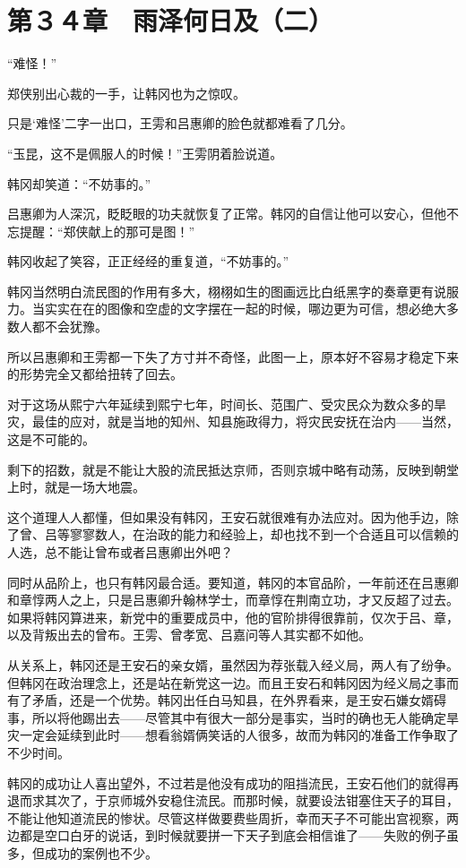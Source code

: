 \section{第３４章　雨泽何日及（二）}

“难怪！”

郑侠别出心裁的一手，让韩冈也为之惊叹。

只是‘难怪’二字一出口，王雱和吕惠卿的脸色就都难看了几分。

“玉昆，这不是佩服人的时候！”王雱阴着脸说道。

韩冈却笑道：“不妨事的。”

吕惠卿为人深沉，眨眨眼的功夫就恢复了正常。韩冈的自信让他可以安心，但他不忘提醒：“郑侠献上的那可是图！”

韩冈收起了笑容，正正经经的重复道，“不妨事的。”

韩冈当然明白流民图的作用有多大，栩栩如生的图画远比白纸黑字的奏章更有说服力。当实实在在的图像和空虚的文字摆在一起的时候，哪边更为可信，想必绝大多数人都不会犹豫。

所以吕惠卿和王雱都一下失了方寸并不奇怪，此图一上，原本好不容易才稳定下来的形势完全又都给扭转了回去。

对于这场从熙宁六年延续到熙宁七年，时间长、范围广、受灾民众为数众多的旱灾，最佳的应对，就是当地的知州、知县施政得力，将灾民安抚在治内——当然，这是不可能的。

剩下的招数，就是不能让大股的流民抵达京师，否则京城中略有动荡，反映到朝堂上时，就是一场大地震。

这个道理人人都懂，但如果没有韩冈，王安石就很难有办法应对。因为他手边，除了曾、吕等寥寥数人，在治政的能力和经验上，却也找不到一个合适且可以信赖的人选，总不能让曾布或者吕惠卿出外吧？

同时从品阶上，也只有韩冈最合适。要知道，韩冈的本官品阶，一年前还在吕惠卿和章惇两人之上，只是吕惠卿升翰林学士，而章惇在荆南立功，才又反超了过去。如果将韩冈算进来，新党中的重要成员中，他的官阶排得很靠前，仅次于吕、章，以及背叛出去的曾布。王雱、曾孝宽、吕嘉问等人其实都不如他。

从关系上，韩冈还是王安石的亲女婿，虽然因为荐张载入经义局，两人有了纷争。但韩冈在政治理念上，还是站在新党这一边。而且王安石和韩冈因为经义局之事而有了矛盾，还是一个优势。韩冈出任白马知县，在外界看来，是王安石嫌女婿碍事，所以将他踢出去——尽管其中有很大一部分是事实，当时的确也无人能确定旱灾一定会延续到此时——想看翁婿俩笑话的人很多，故而为韩冈的准备工作争取了不少时间。

韩冈的成功让人喜出望外，不过若是他没有成功的阻挡流民，王安石他们的就得再退而求其次了，于京师城外安稳住流民。而那时候，就要设法钳塞住天子的耳目，不能让他知道流民的惨状。尽管这样做要费些周折，幸而天子不可能出宫视察，两边都是空口白牙的说话，到时候就要拼一下天子到底会相信谁了——失败的例子虽多，但成功的案例也不少。

